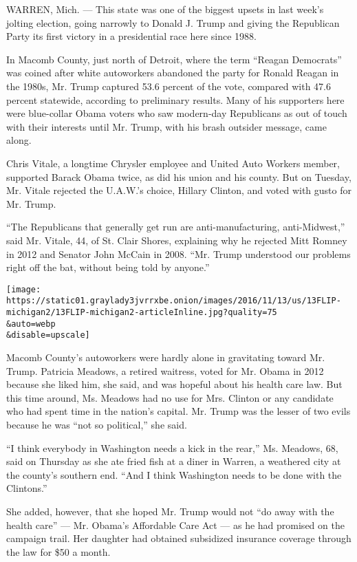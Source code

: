 WARREN, Mich. --- This state was one of the biggest upsets in last
week's jolting election, going narrowly to Donald J. Trump and giving
the Republican Party its first victory in a presidential race here since
1988.

In Macomb County, just north of Detroit, where the term ``Reagan
Democrats'' was coined after white autoworkers abandoned the party for
Ronald Reagan in the 1980s, Mr. Trump captured 53.6 percent of the vote,
compared with 47.6 percent statewide, according to preliminary results.
Many of his supporters here were blue-collar Obama voters who saw
modern-day Republicans as out of touch with their interests until Mr.
Trump, with his brash outsider message, came along.

Chris Vitale, a longtime Chrysler employee and United Auto Workers
member, supported Barack Obama twice, as did his union and his county.
But on Tuesday, Mr. Vitale rejected the U.A.W.'s choice, Hillary
Clinton, and voted with gusto for Mr. Trump.

``The Republicans that generally get run are anti-manufacturing,
anti-Midwest,'' said Mr. Vitale, 44, of St. Clair Shores, explaining why
he rejected Mitt Romney in 2012 and Senator John McCain in 2008. ``Mr.
Trump understood our problems right off the bat, without being told by
anyone.''

\texttt{[image: https://static01.graylady3jvrrxbe.onion/images/2016/11/13/us/13FLIP-michigan2/13FLIP-michigan2-articleInline.jpg?quality=75\\\&auto=webp\\\&disable=upscale]}

Macomb County's autoworkers were hardly alone in gravitating toward Mr.
Trump. Patricia Meadows, a retired waitress, voted for Mr. Obama in 2012
because she liked him, she said, and was hopeful about his health care
law. But this time around, Ms. Meadows had no use for Mrs. Clinton or
any candidate who had spent time in the nation's capital. Mr. Trump was
the lesser of two evils because he was ``not so political,'' she said.

``I think everybody in Washington needs a kick in the rear,'' Ms.
Meadows, 68, said on Thursday as she ate fried fish at a diner in
Warren, a weathered city at the county's southern end. ``And I think
Washington needs to be done with the Clintons.''

She added, however, that she hoped Mr. Trump would not ``do away with
the health care'' --- Mr. Obama's Affordable Care Act --- as he had
promised on the campaign trail. Her daughter had obtained subsidized
insurance coverage through the law for \$50 a month.

